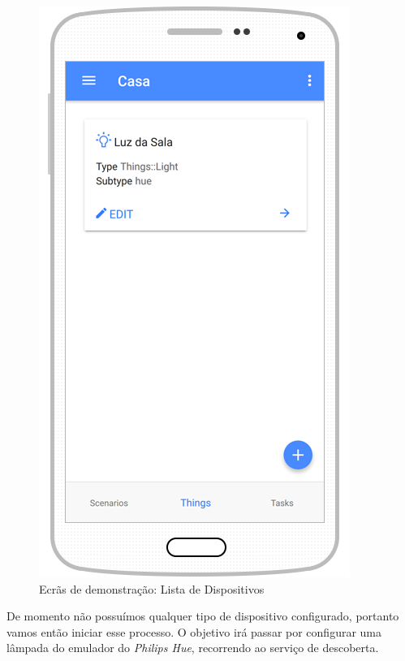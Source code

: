 \begin{figure}[H]
  \centering
        \includegraphics[scale=0.75]{img/demo/list_things.png}
  \caption{Ecrãs de demonstração: Lista de Dispositivos}
\end{figure}

De momento não possuímos qualquer tipo de dispositivo configurado, portanto vamos então iniciar esse processo. O objetivo irá passar por configurar uma lâmpada do emulador do \textit{Philips Hue}, recorrendo ao serviço de descoberta.

